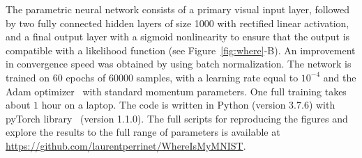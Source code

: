 The parametric neural network consists of a primary visual input layer, followed by two fully connected hidden layers of size 1000  with rectified linear activation, and a final output layer with a sigmoid nonlinearity to ensure that the output is compatible with a likelihood function (see Figure~\ref{fig:where}-B). An improvement in convergence speed was obtained by using batch normalization. The network is trained on $60$ epochs of $60000$ samples, with a learning rate equal to $10^{-4}$ and the Adam optimizer~\cite{kingma2014adam} with standard momentum parameters. One full training takes about $1$ hour on a laptop. The code is written in Python (version 3.7.6) with pyTorch library~\cite{NEURIPS2019_9015} (version 1.1.0). The full scripts for reproducing the figures and explore the results to the full range of parameters is available at \url{https://github.com/laurentperrinet/WhereIsMyMNIST}. %

